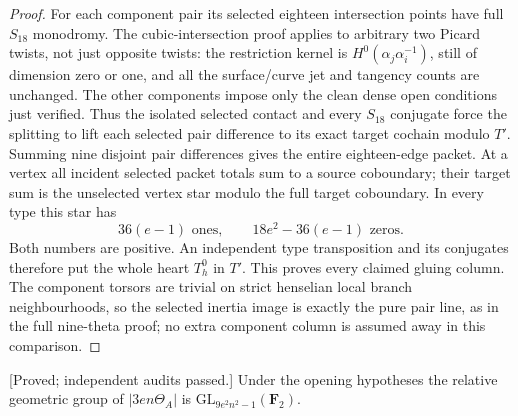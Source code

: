 \begin{proof}
For each component pair its selected eighteen intersection points
have full $S_{18}$ monodromy. The cubic-intersection proof applies
to arbitrary two Picard twists, not just opposite twists: the
restriction kernel is $H^0(\alpha_j\alpha_i^{-1})$, still of
dimension zero or one, and all the surface/curve jet and tangency
counts are unchanged. The other components impose only the clean
dense open conditions just verified. Thus the isolated selected
contact and every $S_{18}$ conjugate force the splitting to lift
each selected pair difference to its exact target cochain modulo
$T'$. Summing nine disjoint pair differences gives the entire
eighteen-edge packet. At a vertex all incident selected packet
totals sum to a source coboundary; their target sum is the
unselected vertex star modulo the full target coboundary. In
every type this star has
\[
              36(e-1)\text{ ones},\qquad
              18e^2-36(e-1)\text{ zeros}.                         \tag{EC.2}
\]
Both numbers are positive. An independent type transposition
and its conjugates therefore put the whole heart $T_h^0$ in $T'$.
This proves every claimed gluing column. The component torsors
are trivial on strict henselian local branch neighbourhoods, so
the selected inertia image is exactly the pure pair line, as in
the full nine-theta proof; no extra component column is assumed
away in this comparison.
\end{proof}

\begin{theorem}
\label{thm:cubic-component-arbitrary-odd-norm-transfer-candidate}
\textup{[Proved; independent audits passed.]}
Under the opening hypotheses the relative geometric group of
$|3en\Theta_A|$ is $\mathrm{GL}_{9e^2n^2-1}(\mathbf F_2)$.
\end{theorem}

